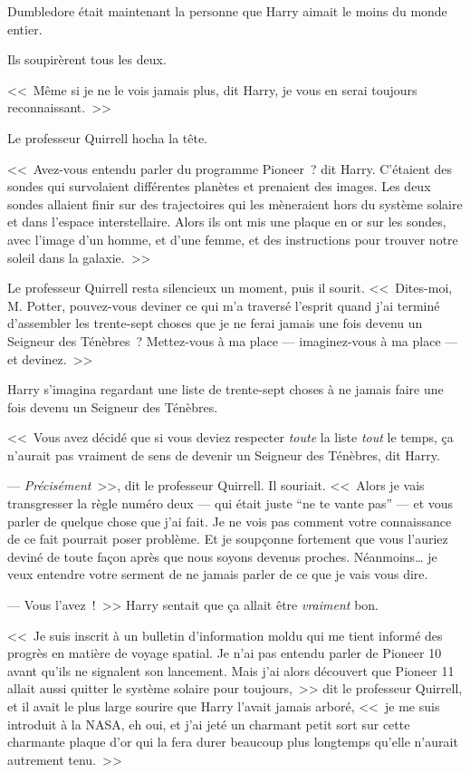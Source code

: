 Dumbledore était maintenant la personne que Harry aimait le moins du monde entier.

Ils soupirèrent tous les deux.

<<~Même si je ne le vois jamais plus, dit Harry, je vous en serai toujours reconnaissant.~>>

Le professeur Quirrell hocha la tête.

<<~Avez-vous entendu parler du programme Pioneer~? dit Harry. C'étaient des sondes qui survolaient différentes planètes et prenaient des images. Les deux sondes allaient finir sur des trajectoires qui les mèneraient hors du système solaire et dans l'espace interstellaire. Alors ils ont mis une plaque en or sur les sondes, avec l'image d'un homme, et d'une femme, et des instructions pour trouver notre soleil dans la galaxie.~>>

Le professeur Quirrell resta silencieux un moment, puis il sourit. <<~Dites-moi, M. Potter, pouvez-vous deviner ce qui m'a traversé l'esprit quand j'ai terminé d'assembler les trente-sept choses que je ne ferai jamais une fois devenu un Seigneur des Ténèbres~? Mettez-vous à ma place — imaginez-vous à ma place — et devinez.~>>

Harry s'imagina regardant une liste de trente-sept choses à ne jamais faire une fois devenu un Seigneur des Ténèbres.

<<~Vous avez décidé que si vous deviez respecter \emph{toute} la liste \emph{tout} le temps, ça n'aurait pas vraiment de sens de devenir un Seigneur des Ténèbres, dit Harry.

--- \emph{Précisément}~>>, dit le professeur Quirrell. Il souriait. <<~Alors je vais transgresser la règle numéro deux — qui était juste “ne te vante pas” — et vous parler de quelque chose que j'ai fait. Je ne vois pas comment votre connaissance de ce fait pourrait poser problème. Et je soupçonne fortement que vous l'auriez deviné de toute façon après que nous soyons devenus proches. Néanmoins… je veux entendre votre serment de ne jamais parler de ce que je vais vous dire.

--- Vous l'avez~!~>> Harry sentait que ça allait être \emph{vraiment} bon.

<<~Je suis inscrit à un bulletin d'information moldu qui me tient informé des progrès en matière de voyage spatial. Je n'ai pas entendu parler de Pioneer 10 avant qu'ils ne signalent son lancement. Mais j'ai alors découvert que Pioneer 11 allait aussi quitter le système solaire pour toujours,~>> dit le professeur Quirrell, et il avait le plus large sourire que Harry l'avait jamais arboré, <<~je me suis introduit à la NASA, eh oui, et j'ai jeté un charmant petit sort sur cette charmante plaque d'or qui la fera durer beaucoup plus longtemps qu'elle n'aurait autrement tenu.~>>

